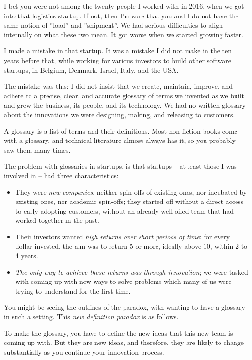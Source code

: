 \documentclass[graybox,envcountchap,sectrefs]{svmono}
\begin{document}
I bet you were not among the twenty people I worked with in 2016, when we got into that logistics startup. If not, then I'm sure that you and I do not have the same notion of ''load'' and ''shipment''. We had serious difficulties to align internally on what these two mean. It got worse when we started growing faster.

I made a mistake in that startup. It was a mistake I did not make in the ten years before that, while working for various investors to build other software startups, in Belgium, Denmark, Israel, Italy, and the USA.
 
The mistake was this: I did not insist that we create, maintain, improve, and adhere to a precise, clear, and accurate glossary of terms we invented as we built and grew the business, its people, and its technology. We had no written glossary about the innovations we were designing, making, and releasing to customers.

A glossary is a list of terms and their definitions. Most non-fiction books come with a glossary, and technical literature almost always has it, so you probably saw them many times.

The problem with glossaries in startups, is that startups -- at least those I was involved in -- had three characteristics: 
\begin{itemize}
    \item They were \textit{new companies}, neither spin-offs of existing ones, nor incubated by existing ones, nor academic spin-offs; they started off without a direct access to early adopting customers, without an already well-oiled team that had worked together in the past.
    \item Their investors wanted \textit{high returns over short periods of time}: for every dollar invested, the aim was to return 5 or more, ideally above 10, within 2 to 4 years.
    \item \textit{The only way to achieve these returns was through innovation}; we were tasked with coming up with new ways to solve problems which many of us were trying to understand for the first time.
\end{itemize}
 
You might be seeing the outlines of the paradox, with wanting to have a glossary in such a setting. This \textit{new definition paradox} is as follows.

To make the glossary, you have to define the new ideas that this new team is coming up with. But they are new ideas, and therefore, they are likely to change substantially as you continue your innovation process. 
\end{document}
